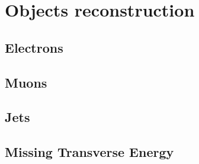 \clearpage{\pagestyle{empty}\cleardoublepage}

\chapter{Objects reconstruction}\label{chap:objects}

\section{Electrons}\label{sec:electrons}
\section{Muons}\label{sec:muons}
\section{Jets}\label{sec:jets}
\section{Missing Transverse Energy}\label{sec:met}
